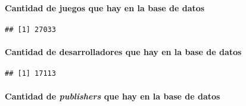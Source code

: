 \documentclass[
]{article}
\newenvironment{Shaded}{\begin{snugshade}}{\end{snugshade}}
\newcommand{\FunctionTok}[1]{\textcolor[rgb]{0.13,0.29,0.53}{\textbf{#1}}}
\newcommand{\NormalTok}[1]{#1}
\newcommand{\SpecialCharTok}[1]{\textcolor[rgb]{0.81,0.36,0.00}{\textbf{#1}}}
\begin{document}
\hypertarget{cantidad-de-juegos-que-hay-en-la-base-de-datos}{%
\paragraph{Cantidad de juegos que hay en la base de
datos}\label{cantidad-de-juegos-que-hay-en-la-base-de-datos}}

\begin{Shaded}
\end{Shaded}

\begin{verbatim}
## [1] 27033
\end{verbatim}

\hypertarget{cantidad-de-desarrolladores-que-hay-en-la-base-de-datos}{%
\paragraph{Cantidad de desarrolladores que hay en la base de
datos}\label{cantidad-de-desarrolladores-que-hay-en-la-base-de-datos}}

\begin{Shaded}
\end{Shaded}

\begin{verbatim}
## [1] 17113
\end{verbatim}

\hypertarget{cantidad-de-publishers-que-hay-en-la-base-de-datos}{%
\paragraph{\texorpdfstring{Cantidad de \emph{publishers} que hay en la
base de
datos}{Cantidad de publishers que hay en la base de datos}}\label{cantidad-de-publishers-que-hay-en-la-base-de-datos}}

\begin{Shaded}
\end{Shaded}
\end{document}
